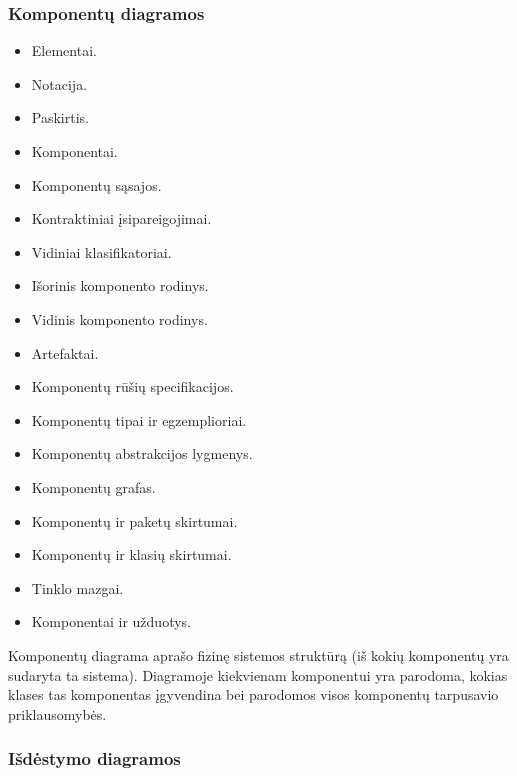 

\subsubsection{Komponentų diagramos}

\begin{itemize}
  \item Elementai.
  \item Notacija.
  \item Paskirtis.
  \item Komponentai.
  \item Komponentų sąsajos.
  \item Kontraktiniai įsipareigojimai.
  \item Vidiniai klasifikatoriai.
  \item Išorinis komponento rodinys.
  \item Vidinis komponento rodinys.
  \item Artefaktai.
  \item Komponentų rūšių specifikacijos.
  \item Komponentų tipai ir egzemplioriai.
  \item Komponentų abstrakcijos lygmenys.
  \item Komponentų grafas.
  \item Komponentų ir paketų skirtumai.
  \item Komponentų ir klasių skirtumai.
  \item Tinklo mazgai.
  \item Komponentai ir užduotys.
\end{itemize}

Komponentų diagrama aprašo fizinę sistemos struktūrą (iš kokių komponentų
yra sudaryta ta sistema). Diagramoje kiekvienam komponentui yra parodoma, 
kokias klases tas komponentas įgyvendina bei parodomos visos komponentų
tarpusavio priklausomybės.



\subsubsection{Išdėstymo diagramos}

